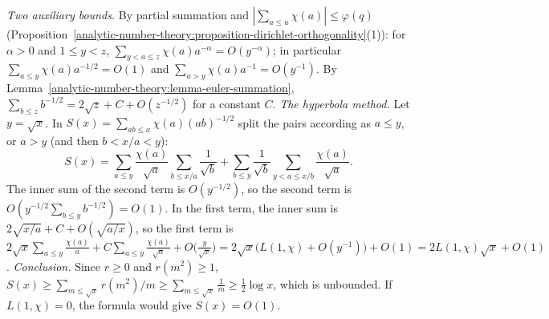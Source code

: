 \begin{solution}
\emph{Two auxiliary bounds.} By partial summation and $|\sum_{a \leq u}\chi(a)| \leq \varphi(q)$ (Proposition~\ref{analytic-number-theory:proposition-dirichlet-orthogonality}(1)): for $\alpha > 0$ and
$1 \leq y < z$, $\sum_{y < a \leq z}\chi(a)a^{-\alpha} = O(y^{-\alpha})$; in particular $\sum_{a \leq y}\chi(a)a^{-1/2} = O(1)$ and $\sum_{a > y}\chi(a)a^{-1} = O(y^{-1})$. By
Lemma~\ref{analytic-number-theory:lemma-euler-summation}, $\sum_{b \leq z}b^{-1/2} = 2\sqrt z + C + O(z^{-1/2})$ for a constant $C$.
\emph{The hyperbola method.} Let $y = \sqrt x$. In $S(x) = \sum_{ab \leq x}\chi(a)(ab)^{-1/2}$ split the pairs according as $a \leq y$, or $a > y$ (and then $b < x/a < y$):
\[
S(x) = \sum_{a \leq y}\frac{\chi(a)}{\sqrt a}\sum_{b \leq x/a}\frac{1}{\sqrt b} + \sum_{b \leq y}\frac{1}{\sqrt b}\sum_{y < a \leq x/b}\frac{\chi(a)}{\sqrt a}.
\]
The inner sum of the second term is $O(y^{-1/2})$, so the second term is $O(y^{-1/2}\sum_{b \leq y}b^{-1/2}) = O(1)$. In the first term, the inner sum is $2\sqrt{x/a} + C + O(\sqrt{a/x})$, so the first term is
$2\sqrt x\sum_{a \leq y}\frac{\chi(a)}{a} + C\sum_{a \leq y}\frac{\chi(a)}{\sqrt a} + O\bigl(\frac{y}{\sqrt x}\bigr) = 2\sqrt x\bigl(L(1, \chi) + O(y^{-1})\bigr) + O(1) = 2L(1, \chi)\sqrt x + O(1)$.
\emph{Conclusion.} Since $r \geq 0$ and $r(m^2) \geq 1$, $S(x) \geq \sum_{m \leq \sqrt x}r(m^2)/m \geq \sum_{m \leq \sqrt x}\frac1m \geq \frac12\log x$, which is unbounded. If $L(1, \chi) = 0$, the formula would
give $S(x) = O(1)$.
\end{solution}
